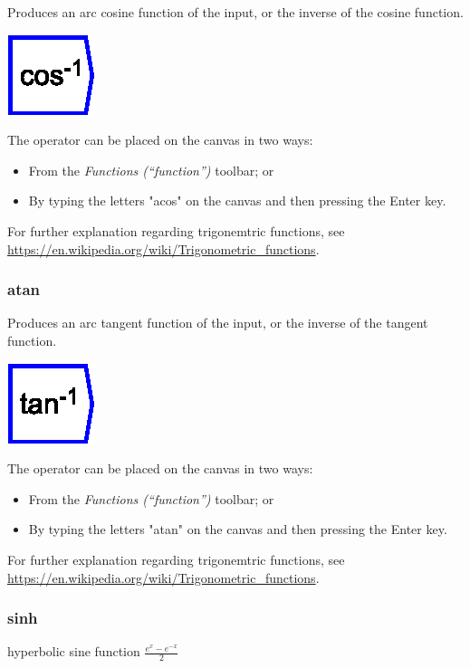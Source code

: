 \label{Operation:acos} Produces an arc cosine function of the input,
or the inverse of the cosine function.

\includegraphics{images/cos-1}

The operator can be placed on the canvas in two ways:
\begin{itemize}
\item From the \emph{Functions (``function'')} toolbar; or 
\item By typing the letters "acos" on the canvas and then pressing the
Enter key.
\end{itemize}
For further explanation regarding trigonemtric functions, see \url{https://en.wikipedia.org/wiki/Trigonometric_functions}.

\subsubsection{atan}

\label{Operation:atan} Produces an arc tangent function of the input,
or the inverse of the tangent function.

\includegraphics{images/tan-1}

The operator can be placed on the canvas in two ways:
\begin{itemize}
\item From the \emph{Functions (``function'')} toolbar; or 
\item By typing the letters "atan" on the canvas and then pressing the
Enter key.
\end{itemize}
For further explanation regarding trigonemtric functions, see \url{https://en.wikipedia.org/wiki/Trigonometric_functions}.

\subsubsection{sinh}

\label{Operation:sinh} hyperbolic sine function $\frac{e^{x}-e^{-x}}{2}$ 

